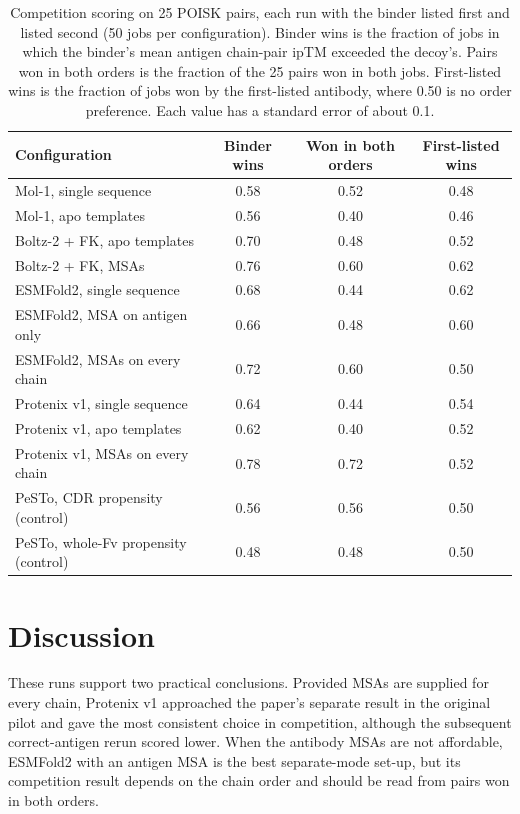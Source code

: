 \documentclass[11pt,a4paper]{article}
\begin{document}
\begin{table}[ht]
\centering
\caption{Competition scoring on 25 POISK pairs, each run with the binder listed first and listed second (50 jobs per configuration). Binder wins is the fraction of jobs in which the binder's mean antigen chain-pair ipTM exceeded the decoy's. Pairs won in both orders is the fraction of the 25 pairs won in both jobs. First-listed wins is the fraction of jobs won by the first-listed antibody, where 0.50 is no order preference. Each value has a standard error of about 0.1.}
\label{tab:competition}
\small
\begin{tabular}{@{}lccc@{}}
\toprule
Configuration & Binder wins & Won in both orders & First-listed wins \\
\midrule
Mol-1, single sequence & 0.58 & 0.52 & 0.48 \\
Mol-1, apo templates & 0.56 & 0.40 & 0.46 \\
Boltz-2 + FK, apo templates & 0.70 & 0.48 & 0.52 \\
Boltz-2 + FK, MSAs & 0.76 & 0.60 & 0.62 \\
ESMFold2, single sequence & 0.68 & 0.44 & 0.62 \\
ESMFold2, MSA on antigen only & 0.66 & 0.48 & 0.60 \\
ESMFold2, MSAs on every chain & 0.72 & 0.60 & 0.50 \\
Protenix v1, single sequence & 0.64 & 0.44 & 0.54 \\
Protenix v1, apo templates & 0.62 & 0.40 & 0.52 \\
Protenix v1, MSAs on every chain & 0.78 & 0.72 & 0.52 \\
\midrule
PeSTo, CDR propensity (control) & 0.56 & 0.56 & 0.50 \\
PeSTo, whole-Fv propensity (control) & 0.48 & 0.48 & 0.50 \\
\bottomrule
\end{tabular}
\end{table}

\section{Discussion}

These runs support two practical conclusions.
Provided MSAs are supplied for every chain, Protenix v1 approached the paper's separate result in the original pilot and gave the most consistent choice in competition, although the subsequent correct-antigen rerun scored lower.
When the antibody MSAs are not affordable, ESMFold2 with an antigen MSA is the best separate-mode set-up, but its competition result depends on the chain order and should be read from pairs won in both orders.
\end{document}
